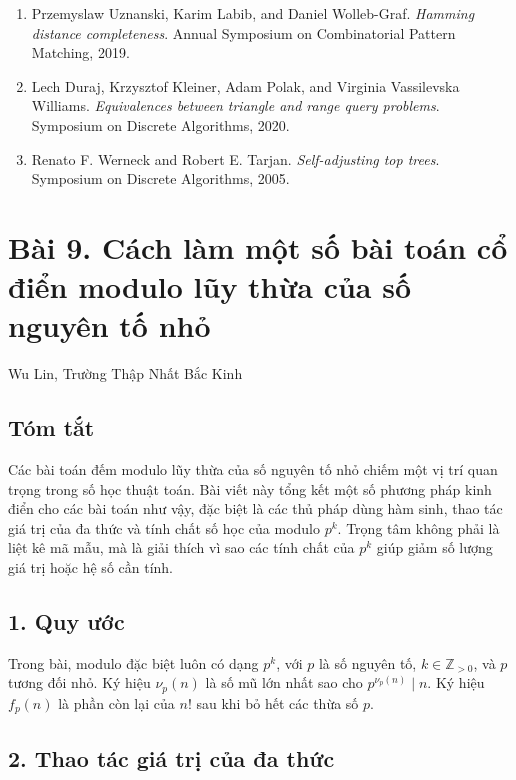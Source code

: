 \documentclass[11pt]{article}
\begin{document}
\begin{enumerate}
  \item Przemyslaw Uznanski, Karim Labib, and Daniel Wolleb-Graf. \emph{Hamming
  distance completeness}. Annual Symposium on Combinatorial Pattern Matching,
  2019.
  \item Lech Duraj, Krzysztof Kleiner, Adam Polak, and Virginia Vassilevska
  Williams. \emph{Equivalences between triangle and range query problems}.
  Symposium on Discrete Algorithms, 2020.
  \item Renato F. Werneck and Robert E. Tarjan. \emph{Self-adjusting top
  trees}. Symposium on Discrete Algorithms, 2005.
\end{enumerate}

\section*{Bài 9. Cách làm một số bài toán cổ điển modulo lũy thừa của số nguyên tố nhỏ}

\begin{center}
Wu Lin, Trường Thập Nhất Bắc Kinh
\end{center}

\subsection*{Tóm tắt}

Các bài toán đếm modulo lũy thừa của số nguyên tố nhỏ chiếm một vị trí quan
trọng trong số học thuật toán. Bài viết này tổng kết một số phương pháp kinh
điển cho các bài toán như vậy, đặc biệt là các thủ pháp dùng hàm sinh, thao tác
giá trị của đa thức và tính chất số học của modulo \(p^k\). Trọng tâm không
phải là liệt kê mã mẫu, mà là giải thích vì sao các tính chất của \(p^k\) giúp
giảm số lượng giá trị hoặc hệ số cần tính.

\subsection*{1. Quy ước}

Trong bài, modulo đặc biệt luôn có dạng \(p^k\), với \(p\) là số nguyên tố,
\(k\in\mathbb Z_{>0}\), và \(p\) tương đối nhỏ. Ký hiệu \(\nu_p(n)\) là số mũ
lớn nhất sao cho \(p^{\nu_p(n)}\mid n\). Ký hiệu \(f_p(n)\) là phần còn lại
của \(n!\) sau khi bỏ hết các thừa số \(p\).

\subsection*{2. Thao tác giá trị của đa thức}
\end{document}
